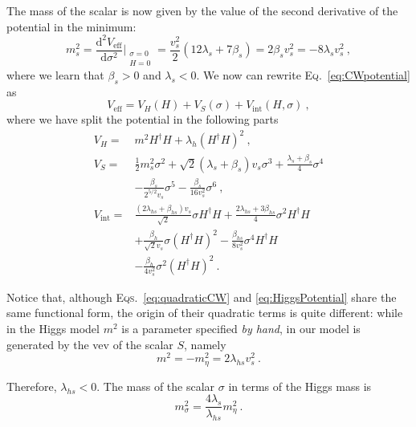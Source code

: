 \documentclass[aps,prd,preprintnumbers,nofootinbibn,twocolumn]{revtex4}
\newcommand{\dif}{\mathrm{d}}
\begin{document}
The mass of the scalar is now given by the value of the second derivative of the potential in the minimum:
\begin{equation}
m_s^2 = \frac{\dif^2 V_\mathrm{eff}}{\dif \sigma^2}\Big|_{\substack{\sigma=0\\ H=0}} \! =\frac{v_s^2}{2} (12 \lambda_s +7\beta_s) =2\beta_s v_s^2 = -8 \lambda_s v_s^2\ ,
\end{equation}
where we learn that $\beta_s > 0 $ and $ \lambda_s < 0$. We now can rewrite \textsc{Eq.}\ \eqref{eq:CWpotential} as
\begin{equation}
V_\mathrm{eff} = V_H (H) + V_S (\sigma) + V_\mathrm{int}(H, \sigma)\ ,
\end{equation}
where we have split the potential in the following parts
\begin{subequations}
\begin{align}
V_H =& m^2 H^\dagger H + \lambda_h (H^\dagger H)^2\label{eq:quadraticCW}\ , \\
V_S =& \frac{1}{2}m_s^2 \sigma^2 + \sqrt{2}(\lambda_s+\beta_s)v_s \sigma^3 + \frac{\lambda_s+\beta_s}{4}\sigma^4 \nonumber \\ &- \frac{\beta_s}{2^{5/2} v_s}\sigma^5 - \frac{\beta_s}{16 v_s^2}\sigma^6\ \label{eq:Spotential},\\
V_\mathrm{int} =& \frac{(2\lambda_{hs} + \beta_{hs})v_s}{\sqrt{2}}\sigma H^\dagger H + \frac{2\lambda_{hs} + 3\beta_{hs}}{4}\sigma^2 H^\dagger H\nonumber\\ &+ \frac{\beta_h}{\sqrt{2} v_s}\sigma (H^\dagger H)^2 - \frac{\beta_{hs}}{8 v_s^2}\sigma^4 H^\dagger H\nonumber \\ &- \frac{\beta_h}{4 v_s^2}\sigma^2 (H^\dagger H)^2\ . \label{eq:interlagr}
\end{align}
\end{subequations}

Notice that, although \textsc{Eqs.}\ \eqref{eq:quadraticCW} and \eqref{eq:HiggsPotential} share the same functional form, the origin of their quadratic terms is quite different: while in the Higgs model $m^2$ is a parameter specified \textit{by hand}, in our model is generated by the vev of the scalar $S$, namely
\begin{equation}
m^2 = -m_\eta^2 = 2 \lambda_{hs} v_s^2\ .
\end{equation}

Therefore, $\lambda_{hs} < 0$. The mass of the scalar $\sigma$ in terms of the Higgs mass is
\begin{equation}
m_\sigma^2 = \frac{4\lambda_s}{\lambda_{hs}}m_\eta^2\ .
\end{equation}
\end{document}
